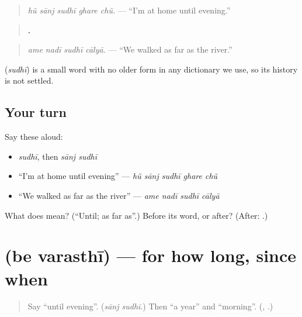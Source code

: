 \begin{quote}
\emph{hũ sānj sudhī ghare chũ.} — \textquotedblleft{}I'm at home until evening.\textquotedblright{}
\end{quote}

\begin{quote}
\textbf{   .}
\end{quote}

\begin{quote}
\emph{ame nadī sudhī cālyā.} — \textquotedblleft{}We walked as far as the river.\textquotedblright{}
\end{quote}

\begin{cousinweb}
\textbf{} (\emph{sudhī}) is a small word with no older form in any dictionary we use, so its history is not settled.
\end{cousinweb}

\subsection*{Your turn}
Say these aloud:

\begin{itemize}
\raggedright
  \item \emph{sudhī}, then \emph{sānj sudhī}
  \item \textquotedblleft{}I'm at home until evening\textquotedblright{} — \emph{hũ sānj sudhī ghare chũ}
  \item \textquotedblleft{}We walked as far as the river\textquotedblright{} — \emph{ame nadī sudhī cālyā}
\end{itemize}

\begin{tcolorbox}[breakable,colback=teal!4,colframe=teal!35!black,title={Before you move on}]
What does \textbf{} mean? (\textquotedblleft{}Until; as far as\textquotedblright{}.) Before its word, or after? (After: \textbf{ }.)
\end{tcolorbox}
\section[\texorpdfstring{\gu{બે} \gu{વરસથી} (be varasthī)}{બે વરસથી (be varasthī)}]{  (be varasthī) — for how long, since when}

\label{lesson:GU-C282-be-varasthi}



\begin{quote}
Say \textquotedblleft{}until evening\textquotedblright{}. (\emph{sānj sudhī}.) Then \textquotedblleft{}a year\textquotedblright{} and \textquotedblleft{}morning\textquotedblright{}. (\textbf{}, \textbf{}.)
\end{quote}


